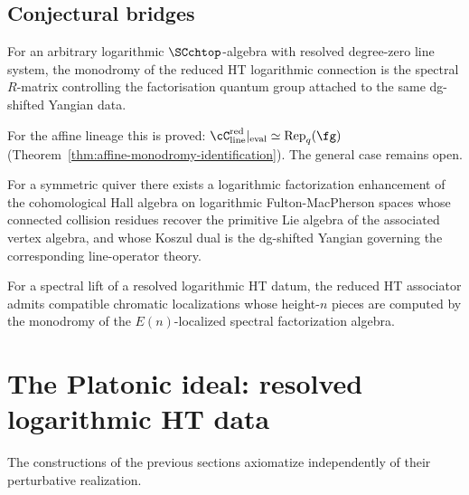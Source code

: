 \subsection{Conjectural bridges}

\begin{conjecture}%
For an arbitrary logarithmic $\SCchtop$-algebra with resolved degree-zero line system, the monodromy of the reduced HT logarithmic connection is the spectral $R$-matrix controlling the factorisation quantum group attached to the same dg-shifted Yangian data.

For the affine lineage this is proved: $\cC_{\mathrm{line}}^{\mathrm{red}}|_{\mathrm{eval}} \simeq \mathrm{Rep}_q(\fg)$ (Theorem~\ref{thm:affine-monodromy-identification}). The general case remains open.
\end{conjecture}

\begin{conjecture}%
For a symmetric quiver there exists a logarithmic factorization enhancement of the cohomological Hall algebra on logarithmic Fulton-MacPherson spaces whose connected collision residues recover the primitive Lie algebra of the associated vertex algebra, and whose Koszul dual is the dg-shifted Yangian governing the corresponding line-operator theory.
\end{conjecture}

\begin{conjecture}%
For a spectral lift of a resolved logarithmic HT datum, the reduced HT associator admits compatible chromatic localizations whose height-$n$ pieces are computed by the monodromy of the $E(n)$-localized spectral factorization algebra.
\end{conjecture}

\section{The Platonic ideal: resolved logarithmic HT data}%

The constructions of the previous sections axiomatize independently of their perturbative realization.


